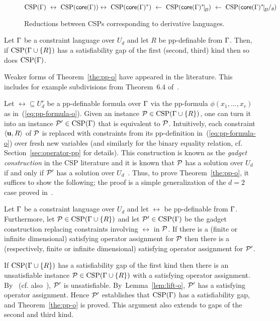 \begin{figure}[t!]
\[
\CSP(\Gm)\ \leftrightarrow\ \CSP(\core(\Gm)) \leftrightarrow\ \CSP(\core(\Gm)^*)\ \leftarrow\ \CSP(\core(\Gm)^*\red B) \ \leftarrow\ \CSP(\core(\Gm)^*\red B\fac\th)
\]
\caption{Reductions between CSPs corresponding to derivative languages.}
\label{fig:reductions-o}
\end{figure}


\begin{theorem}\label{the:pp-o}
  Let $\Gamma$ be a constraint language over $U_d$ and let $R$ be pp-definable from
  $\Gamma$. Then, if ${\rm CSP}(\Gamma\cup\{R\})$ has a satisfiability gap of the first (second, third) kind then so does
  ${\rm CSP}(\Gamma)$.
\end{theorem}

Weaker forms of Theorem~\ref{the:pp-o} have appeared in the literature. This includes for example subdivisions from Theorem~6.4 of~\cite{Mastel24:stoc}.

Let $\rel\subseteq U_d^r$ be a pp-definable formula
over $\Gamma$ via the pp-formula $\phi(x_1,\ldots,x_r)$ as in~(\ref{eq:pp-formula-o}).
Given an instance
${\mathcal P}\in{\rm CSP}(\Gamma\cup\{R\})$, one can turn it into an instance
${\mathcal P}'\in{\rm CSP}(\Gamma)$ that is equivalent to ${\mathcal P}$. 
% 
Intuitively, each constraint $\langle {\bf u},R \rangle$ of ${\mathcal P}$ is replaced with
constraints 
from its pp-definition in~(\ref{eq:pp-formula-o})
over fresh new variables (and similarly for the binary equality relation, cf. Section~\ref{sec:operator-pp} for details).
%
This construction is known as the \emph{gadget construction} in the CSP
literature and it is known that ${\mathcal P}$ has a solution over $U_d$
if and only if ${\mathcal P}'$ has a solution over $U_d$~\cite{Bulatov05:classifying,BKW17}.
%
Thus, to prove Theorem~\ref{the:pp-o}, it suffices to show the following;
the proof is a simple generalization of the $d=2$ case
proved in~\cite{AKS19:jcss}.

\begin{lemma}\label{lem:lift-o}
  Let $\Gamma$ be a constraint language over $U_d$ and let $\rel$ be pp-definable
  from $\Gamma$. Furthermore, let ${\mathcal P}\in{\rm CSP}(\Gamma\cup\{R\})$ and let
  ${\mathcal P}'\in{\rm CSP}(\Gamma)$ be the gadget construction replacing constraints involving
  $\rel$ in ${\mathcal P}$. If there is a (finite or infinite dimensional) satisfying operator assignment for ${\mathcal P}$ then there is a (respectively, finite or infinite dimensional) satisfying operator assignment for ${\mathcal P}'$. 
\end{lemma}

If ${\rm CSP}(\Gamma\cup\{R\})$ has a satisfiability gap of the first kind then there is
an unsatisfiable instance ${\mathcal P}\in{\rm CSP}(\Gamma\cup\{R\})$ with a satisfying
operator assignment. By~\cite{Bulatov05:classifying} (cf.
also~\cite{BKW17}), ${\mathcal P}'$ is unsatisfiable. By~Lemma~\ref{lem:lift-o}, ${\mathcal P}'$ has a satisfying operator assignment. 
Hence ${\mathcal P}'$ establishes that ${\rm CSP}(\Gamma)$ has a satisfiability gap, and
Theorem~\ref{the:pp-o} is proved. This argument also extends to gaps of the second and third kind.

